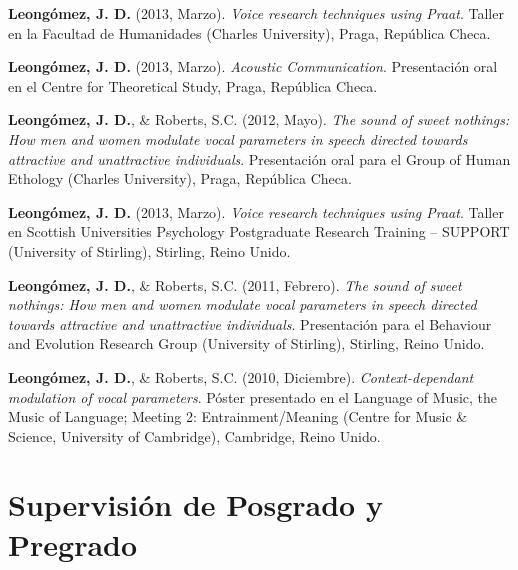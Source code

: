 \documentclass[11pt,a4paper,]{awesome-cv}
\begin{document}
\textbf{Leongómez, J. D.} (2013, Marzo). \emph{Voice research techniques
using Praat}. Taller en la Facultad de Humanidades (Charles University),
Praga, República Checa.

\textbf{Leongómez, J. D.} (2013, Marzo). \emph{Acoustic Communication}.
Presentación oral en el Centre for Theoretical Study, Praga, República
Checa.

\textbf{Leongómez, J. D.}, \& Roberts, S.C. (2012, Mayo). \emph{The
sound of sweet nothings: How men and women modulate vocal parameters in
speech directed towards attractive and unattractive individuals}.
Presentación oral para el Group of Human Ethology (Charles University),
Praga, República Checa.

\textbf{Leongómez, J. D.} (2013, Marzo). \emph{Voice research techniques
using Praat}. Taller en Scottish Universities Psychology Postgraduate
Research Training -- SUPPORT (University of Stirling), Stirling, Reino
Unido.

\textbf{Leongómez, J. D.}, \& Roberts, S.C. (2011, Febrero). \emph{The
sound of sweet nothings: How men and women modulate vocal parameters in
speech directed towards attractive and unattractive individuals}.
Presentación para el Behaviour and Evolution Research Group (University
of Stirling), Stirling, Reino Unido.

\textbf{Leongómez, J. D.}, \& Roberts, S.C. (2010, Diciembre).
\emph{Context-dependant modulation of vocal parameters}. Póster
presentado en el Language of Music, the Music of Language; Meeting 2:
Entrainment/Meaning (Centre for Music \& Science, University of
Cambridge), Cambridge, Reino Unido.

\endgroup

\hypertarget{supervisiuxf3n-de-posgrado-y-pregrado}{%
\section{Supervisión de Posgrado y
Pregrado}\label{supervisiuxf3n-de-posgrado-y-pregrado}}
\end{document}
